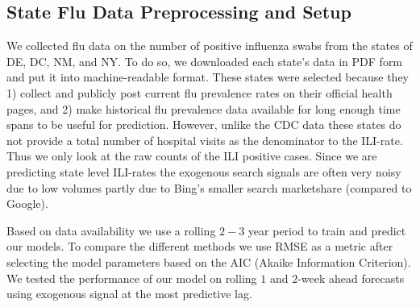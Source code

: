 \documentclass[12pt]{article}
\begin{document}
\subsection{State Flu Data Preprocessing and Setup}

We collected flu data on the number of positive influenza swabs from the states of DE, DC, NM, and NY. To do so, we downloaded each state's data in PDF form and put it into machine-readable format. These states were selected because they 1) collect and publicly post current flu prevalence rates on their official health pages, and 2) make historical flu prevalence data available for long enough time spans to be useful for prediction. However, unlike the CDC data these states do not provide a total number of hospital visits as the denominator to the ILI-rate. Thus we only look at the raw counts of the ILI positive cases. Since we are predicting state level ILI-rates the exogenous search signals are often very noisy due to low volumes partly due to Bing's smaller search marketshare (compared to Google). 

Based on data availability we use a rolling $2-3$ year period to train and predict our models. To compare the different methods we use RMSE as a metric after selecting the model parameters based on the AIC (Akaike Information Criterion). We tested the performance of our model on rolling $1$ and $2$-week ahead forecasts using exogenous signal at the most predictive lag.
\end{document}
